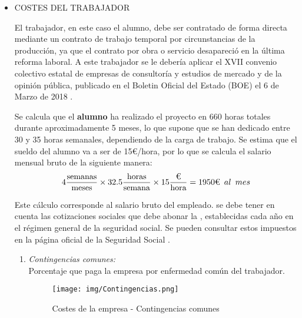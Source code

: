 \begin{itemize}
    \item\textit{} {COSTES DEL TRABAJADOR}

    El trabajador, en este caso el alumno, debe ser contratado de forma directa mediante un contrato de trabajo temporal por circunstancias de la producción, ya que el contrato por obra o servicio desapareció en la última reforma laboral. A este trabajador se le debería aplicar el XVII convenio colectivo estatal de empresas de consultoría y estudios de mercado y de la opinión pública, publicado en el Boletin Oficial del Estado (BOE) el 6 de Marzo de 2018 \cite{BOE}.

    Se calcula que el \textbf{alumno} ha realizado el proyecto en 660 horas totales durante aproximadamente 5 meses, lo que supone que se han dedicado entre 30 y 35 horas semanales, dependiendo de la carga de trabajo.
    Se estima que el sueldo del alumno va a ser de 15€/hora, por lo que se calcula el salario mensual bruto de la siguiente manera:
    $$ 4\frac{\text{semanas}}{\text{meses}}\times32.5\frac{\text{horas}}{\text{semana}}\times15\frac{\text{€}}{\text{hora}}=1950\text{€}\hspace{0.5em}al\hspace{0.5em}mes $$

    Este cálculo corresponde al salario bruto del empleado. se debe tener en cuenta las cotizaciones sociales que debe abonar la , establecidas cada año en el régimen general de la seguridad social. Se pueden consultar estos impuestos en la página oficial de la Seguridad Social \cite{SeguridadSocial}.

    \begin{enumerate}
        \item\textit {Contingencias comunes:}\\
        Porcentaje que paga la empresa por enfermedad común del trabajador.

        \begin{figure}[ht]
              \begin{minipage}{1.3\textwidth}
                \centering
                \texttt{[image: img/Contingencias.png]} \\
                \caption{Costes de la empresa - Contingencias comunes}
                \label{Costes de la empresa - Contingencias comunes}
            \end{minipage}
        \end{figure}
        

\end{enumerate}
\end{itemize}
